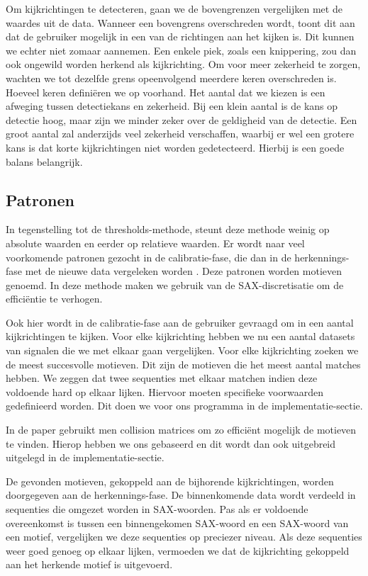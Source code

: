 \documentclass{article}
\begin{document}
Om kijkrichtingen te detecteren, gaan we de bovengrenzen vergelijken met de waardes uit de data. Wanneer een bovengrens overschreden wordt, toont dit aan dat de gebruiker mogelijk in een van de richtingen aan het kijken is. Dit kunnen we echter niet zomaar aannemen. Een enkele piek, zoals een knippering, zou dan ook ongewild worden herkend als kijkrichting. Om voor meer zekerheid te zorgen, wachten we tot dezelfde grens opeenvolgend meerdere keren overschreden is. Hoeveel keren definiëren we op voorhand. Het aantal dat we kiezen is een afweging tussen detectiekans en zekerheid. Bij een klein aantal is de kans op detectie hoog, maar zijn we minder zeker over de geldigheid van de detectie. Een groot aantal zal anderzijds veel zekerheid verschaffen, waarbij er wel een grotere kans is dat korte kijkrichtingen niet worden gedetecteerd. Hierbij is een goede balans belangrijk.

\subsection{Patronen}

In tegenstelling tot de thresholds-methode, steunt deze methode weinig op absolute waarden en eerder op relatieve waarden. Er wordt naar veel voorkomende patronen gezocht in de calibratie-fase, die dan in de herkennings-fase met de nieuwe data vergeleken worden \cite{motifs}. Deze patronen worden motieven genoemd. In deze methode maken we gebruik van de SAX-discretisatie om de efficiëntie te verhogen.

Ook hier wordt in de calibratie-fase aan de gebruiker gevraagd om in een aantal kijkrichtingen te kijken. Voor elke kijkrichting hebben we nu een aantal datasets van signalen die we met elkaar gaan vergelijken. Voor elke kijkrichting zoeken we de meest succesvolle motieven. Dit zijn de motieven die het meest aantal matches hebben. We zeggen dat twee sequenties met elkaar matchen indien deze voldoende hard op elkaar lijken. Hiervoor moeten specifieke voorwaarden gedefinieerd worden. Dit doen we voor ons programma in de implementatie-sectie.

In de paper \cite{motifs} gebruikt men collision matrices om zo efficiënt mogelijk de motieven te vinden. Hierop hebben we ons gebaseerd en dit wordt dan ook uitgebreid uitgelegd in de implementatie-sectie.

De gevonden motieven, gekoppeld aan de bijhorende kijkrichtingen, worden doorgegeven aan de herkennings-fase. De binnenkomende data wordt verdeeld in sequenties die omgezet worden in SAX-woorden. Pas als er voldoende overeenkomst is tussen een binnengekomen SAX-woord en een SAX-woord van een motief, vergelijken we deze sequenties op preciezer niveau. Als deze sequenties weer goed genoeg op elkaar lijken, vermoeden we dat de kijkrichting gekoppeld aan het herkende motief is uitgevoerd.
\end{document}
